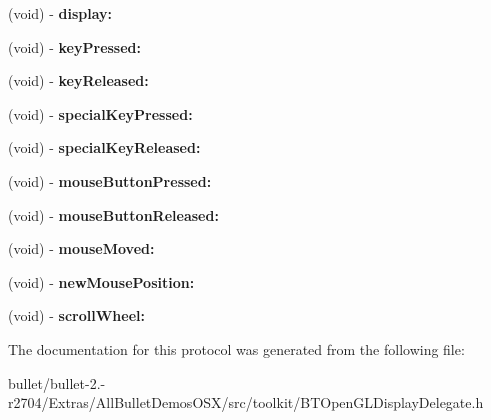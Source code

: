 \begin{DoxyCompactItemize}
\item 
\hypertarget{protocol_b_t_open_g_l_display_delegate-p_a40c3b5269311b9bce83bda8a7e64b575}{(void) -\/ {\bfseries display\+:}}\label{protocol_b_t_open_g_l_display_delegate-p_a40c3b5269311b9bce83bda8a7e64b575}

\item 
\hypertarget{protocol_b_t_open_g_l_display_delegate-p_a19b0c7c9aa5e2a5b57228c8194da5755}{(void) -\/ {\bfseries key\+Pressed\+:}}\label{protocol_b_t_open_g_l_display_delegate-p_a19b0c7c9aa5e2a5b57228c8194da5755}

\item 
\hypertarget{protocol_b_t_open_g_l_display_delegate-p_adb392ecc51a776dffa5cf1a879d31097}{(void) -\/ {\bfseries key\+Released\+:}}\label{protocol_b_t_open_g_l_display_delegate-p_adb392ecc51a776dffa5cf1a879d31097}

\item 
\hypertarget{protocol_b_t_open_g_l_display_delegate-p_a2db1e130b7c885d6396bb58c3531260b}{(void) -\/ {\bfseries special\+Key\+Pressed\+:}}\label{protocol_b_t_open_g_l_display_delegate-p_a2db1e130b7c885d6396bb58c3531260b}

\item 
\hypertarget{protocol_b_t_open_g_l_display_delegate-p_ab0d8faca68a3752b470f88f68f74fc3c}{(void) -\/ {\bfseries special\+Key\+Released\+:}}\label{protocol_b_t_open_g_l_display_delegate-p_ab0d8faca68a3752b470f88f68f74fc3c}

\item 
\hypertarget{protocol_b_t_open_g_l_display_delegate-p_a5a1b89b09ac6bf2a305fee7cd7e68db3}{(void) -\/ {\bfseries mouse\+Button\+Pressed\+:}}\label{protocol_b_t_open_g_l_display_delegate-p_a5a1b89b09ac6bf2a305fee7cd7e68db3}

\item 
\hypertarget{protocol_b_t_open_g_l_display_delegate-p_a5b452c7546f38a7208cf8e1030acbd6a}{(void) -\/ {\bfseries mouse\+Button\+Released\+:}}\label{protocol_b_t_open_g_l_display_delegate-p_a5b452c7546f38a7208cf8e1030acbd6a}

\item 
\hypertarget{protocol_b_t_open_g_l_display_delegate-p_a176a480e94f1e7066f998bb669b8547f}{(void) -\/ {\bfseries mouse\+Moved\+:}}\label{protocol_b_t_open_g_l_display_delegate-p_a176a480e94f1e7066f998bb669b8547f}

\item 
\hypertarget{protocol_b_t_open_g_l_display_delegate-p_a1915d774b5ce27df4d9b293bb02ed011}{(void) -\/ {\bfseries new\+Mouse\+Position\+:}}\label{protocol_b_t_open_g_l_display_delegate-p_a1915d774b5ce27df4d9b293bb02ed011}

\item 
\hypertarget{protocol_b_t_open_g_l_display_delegate-p_a39ebb9b628268c0e747430a2e0efd727}{(void) -\/ {\bfseries scroll\+Wheel\+:}}\label{protocol_b_t_open_g_l_display_delegate-p_a39ebb9b628268c0e747430a2e0efd727}

\end{DoxyCompactItemize}


The documentation for this protocol was generated from the following file\+:\begin{DoxyCompactItemize}
\item 
bullet/bullet-\/2.-\/r2704/\+Extras/\+All\+Bullet\+Demos\+O\+S\+X/src/toolkit/B\+T\+Open\+G\+L\+Display\+Delegate.\+h\end{DoxyCompactItemize}
